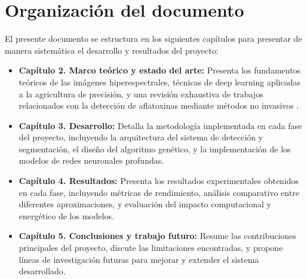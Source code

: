 \section{Organización del documento}
El presente documento se estructura en los siguientes capítulos para presentar de manera sistemática el desarrollo y resultados del proyecto:

\begin{itemize}
    \item \textbf{Capítulo 2. Marco teórico y estado del arte:} Presenta los fundamentos teóricos de las imágenes hiperespectrales, técnicas de deep learning aplicadas a la agricultura de precisión, y una revisión exhaustiva de trabajos relacionados con la detección de aflatoxinas mediante métodos no invasivos \cite{PAOLETTI2019279, jimaging5050052, WIEME2022156, agriengineering6040225}.
    \item \textbf{Capítulo 3. Desarrollo:} Detalla la metodología implementada en cada fase del proyecto, incluyendo la arquitectura del sistema de detección y segmentación, el diseño del algoritmo genético, y la implementación de los modelos de redes neuronales profundas.
    \item \textbf{Capítulo 4. Resultados:} Presenta los resultados experimentales obtenidos en cada fase, incluyendo métricas de rendimiento, análisis comparativo entre diferentes aproximaciones, y evaluación del impacto computacional y energético de los modelos.
    \item \textbf{Capítulo 5. Conclusiones y trabajo futuro:} Resume las contribuciones principales del proyecto, discute las limitaciones encontradas, y propone líneas de investigación futuras para mejorar y extender el sistema desarrollado.
\end{itemize}
